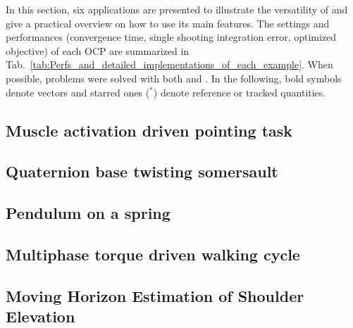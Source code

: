 In this section, six applications are presented to illustrate the versatility of \bioptim and give a practical overview on how to use its main features.
The settings and performances (convergence time, single shooting integration error, optimized objective) of each OCP are summarized in Tab.~\ref{tab:Perfs_and_detailed_implementations_of_each_example}. 
When possible, problems were solved with both \ipopt and \acados.
In the following, bold symbols denote vectors and starred ones ($^*$) denote reference or tracked quantities.


\subsection{Muscle activation driven pointing task}\label{ex:poiting}


\subsection{Quaternion base twisting somersault}\label{ex:somersault}


\subsection{Pendulum on a spring}\label{ex:spring}


\subsection{Multiphase torque driven walking cycle}\label{ex:walking}


\subsection{Moving Horizon Estimation of Shoulder Elevation}\label{ex:mhe}


